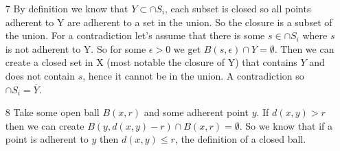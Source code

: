 \documentclass{article}
\begin{document}
\begin{enumerate}
    \item[7]
      By definition we know that $Y\subset\cap S_i$, each subset is closed so all points adherent to Y are adherent to a set in the union. So the closure is a subset of the union. For a contradiction let's assume that there is some $s\in\cap S_i$ where $s$ is not adherent to Y. So for some $\epsilon>0$ we get $B(s,\epsilon)\cap Y=\emptyset$. Then we can create a closed set in X (most notable the closure of Y) that contains $Y$ and does not contain $s$, hence it cannot be in the union. A contradiction so $\cap S_i=\overline{Y}$.
    \item[8]
      Take some open ball $B(x,r)$ and some adherent point $y$. If $d(x,y)>r$ then we can create $B(y,d(x,y)-r)\cap B(x,r)=\emptyset$. So we know that if a point is adherent to $y$ then $d(x,y)\leq r$, the definition of a closed ball. 
  \end{enumerate}
\end{document}
